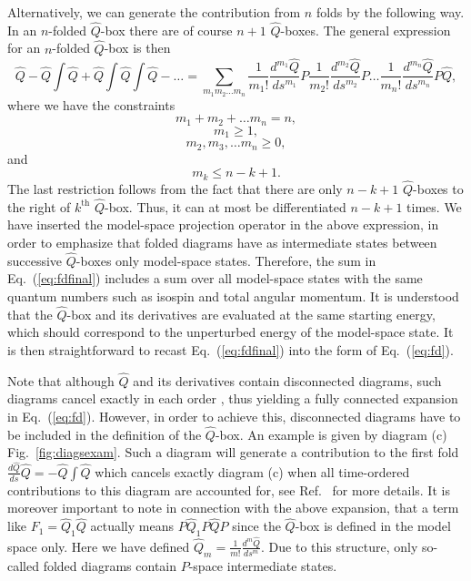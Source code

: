 \documentclass[twoside,12pt]{article}
\begin{document}
Alternatively, we can generate the contribution
from $n$ folds by the following way. In
an $n$-folded $\hat{Q}$-box there are of course $n+1$ $\hat{Q}$-boxes. The
general expression for an $n$-folded $\hat{Q}$-box is then
\begin{equation}
        \hat{Q}   -\hat{Q}\int\hat{Q}
    +\hat{Q}\int\hat{Q}\int\hat{Q} -\dots=
    {\displaystyle\sum_{m_1m_2\dots m_n}}
    \frac{1}{m_1!}\frac{d^{m_1}\hat{Q}}{ds^{m_1}}P
    \frac{1}{m_2!}\frac{d^{m_2}\hat{Q}}{ds^{m_2}}P
    \dots
    \frac{1}{m_n!}\frac{d^{m_n}\hat{Q}}{ds^{m_n}}P\hat{Q},
\label{eq:fdfinal}
\end{equation}
where we have the constraints
\[
  m_1+m_2+\dots m_n=n,
\]
\[
m_1\geq 1,
\]
\[
m_2, m_3, \dots m_n \geq 0,
\]
and
\[
m_k \leq n-k+1.
\]
The last restriction follows from the fact that there are only
$n-k+1$ $\hat{Q}$-boxes to the right of $k^{\mathrm{th}}$ $\hat{Q}$-box.
Thus, it can at most be differentiated $n-k+1$ times.
We have inserted the model-space projection operator in the above
expression, in order to emphasize that folded diagrams have as intermediate
states between successive $\hat{Q}$-boxes
only model-space states. Therefore, the sum in Eq.\ (\ref{eq:fdfinal})
includes a sum over all model-space states with the same quantum
numbers such as isospin and total angular momentum. It is understood
that the $\hat{Q}$-box  and its derivatives are evaluated at the
same starting energy, which should correspond to the unperturbed
energy of the model-space state.
It is then straightforward to recast Eq.\ (\ref{eq:fdfinal})
into the form of Eq.\ (\ref{eq:fd}).

Note that although $\hat{Q}$ and its derivatives contain disconnected
diagrams, such diagrams cancel exactly in each order \cite{ko90}, thus
yielding a fully connected expansion in Eq.\ (\ref{eq:fd}).
However, in order to achieve this, disconnected diagrams have
to be included in the definition of the $\hat{Q}$-box. An example
is given by diagram (c) Fig.\ \ref{fig:diagsexam}.
Such a diagram will generate a contribution to
the first fold $\frac{d\hat{Q}}{ds}\hat{Q}=-\hat{Q}\int\hat{Q} $
which cancels exactly diagram (c) when all time-ordered
contributions to this diagram are accounted for, see Ref.\ \cite{ko90}
for more details.
It is moreover important to note in connection with the above
expansion, that a term like
$F_1= \hat{Q}_1 \hat{Q}$ actually means $P\hat{Q}_1 P\hat{Q}P$ since
the $\hat{Q}$-box is defined in the model space only. Here we have defined
$\hat{Q}_{m}=\frac{1}{m!}\frac{d^{m}\hat{Q}}
{ds^{m}}$.
Due to this structure, only so-called folded diagrams
contain $P$-space intermediate states.
\end{document}
